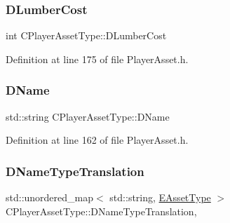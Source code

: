 \hypertarget{classCPlayerAssetType_aab2aeb930d654fd5eab51be157b3439f}{}\label{classCPlayerAssetType_aab2aeb930d654fd5eab51be157b3439f} 
\subsubsection{\texorpdfstring{D\+Lumber\+Cost}{DLumberCost}}
{\footnotesize\ttfamily int C\+Player\+Asset\+Type\+::\+D\+Lumber\+Cost\hspace{0.3cm}{\ttfamily [protected]}}



Definition at line 175 of file Player\+Asset.\+h.

\hypertarget{classCPlayerAssetType_a95b557ce33af1aaecb26e8d78b0e2706}{}\label{classCPlayerAssetType_a95b557ce33af1aaecb26e8d78b0e2706} 
\subsubsection{\texorpdfstring{D\+Name}{DName}}
{\footnotesize\ttfamily std\+::string C\+Player\+Asset\+Type\+::\+D\+Name\hspace{0.3cm}{\ttfamily [protected]}}



Definition at line 162 of file Player\+Asset.\+h.

\hypertarget{classCPlayerAssetType_a4e7728e5316eb5c1124dcac90f5290d5}{}\label{classCPlayerAssetType_a4e7728e5316eb5c1124dcac90f5290d5} 
\subsubsection{\texorpdfstring{D\+Name\+Type\+Translation}{DNameTypeTranslation}}
{\footnotesize\ttfamily std\+::unordered\+\_\+map$<$ std\+::string, \hyperlink{GameDataTypes_8h_a5600d4fc433b83300308921974477fec}{E\+Asset\+Type} $>$ C\+Player\+Asset\+Type\+::\+D\+Name\+Type\+Translation\hspace{0.3cm}{\ttfamily [static]}, {\ttfamily [protected]}}



